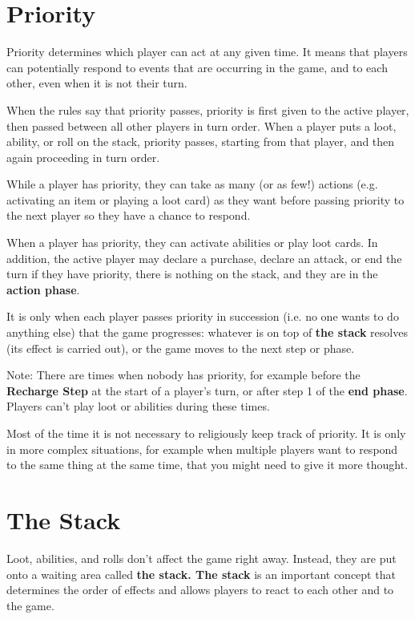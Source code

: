 \documentclass[
  fontsize=10pt,
  paper=a5,
  version=last,
  chapterprefix=true,
  bindingoffset=5mm,
  ]{scrbook}
\begin{document}
    \chapter{Priority}
    \label{priority}
    Priority determines which player can act at any given time. It means that players can potentially respond to events that are occurring in the game, and to each other, even when it is not their turn.

    When the rules say that priority passes, priority is first given to the active player, then passed between all other players in turn order. When a player puts a loot, ability, or roll on the stack, priority passes, starting from that player, and then again proceeding in turn order.

    While a player has priority, they can take as many (or as few!) actions (e.g. activating an item or playing a loot card) as they want before passing priority to the next player so they have a chance to respond.

    When a player has priority, they can activate abilities or play loot cards. In addition, the active player may declare a purchase, declare an attack, or end the turn if they have priority, there is nothing on the stack, and they are in the \textbf{action phase}.

    It is only when each player passes priority in succession (i.e. no one wants to do anything else) that the game progresses: whatever is on top of \textbf{the stack} resolves (its effect is carried out), or the game moves to the next step or phase.

    Note: There are times when nobody has priority, for example before the \textbf{Recharge Step} at the start of a player’s turn, or after step 1 of the \textbf{end phase}. Players can’t play loot or abilities during these times.

    Most of the time it is not necessary to religiously keep track of priority. It is only in more complex situations, for example when multiple players want to respond to the same thing at the same time, that you might need to give it more thought.

    \chapter{The Stack}
    \label{stack}
    Loot, abilities, and rolls don’t affect the game right away. Instead, they are put onto a waiting area called \textbf{the stack. The stack} is an important concept that determines the order of effects and allows players to react to each other and to the game.
\end{document}
